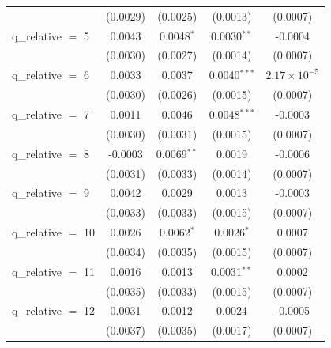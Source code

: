 \begin{tabular}{lcccc}
                        & (0.0029)             & (0.0025)            & (0.0013)                  & (0.0007)\\   
   q\_relative $=$ 5    & 0.0043               & 0.0048$^{*}$        & 0.0030$^{**}$             & -0.0004\\   
                        & (0.0030)             & (0.0027)            & (0.0014)                  & (0.0007)\\   
   q\_relative $=$ 6    & 0.0033               & 0.0037              & 0.0040$^{***}$            & $2.17\times 10^{-5}$\\    
                        & (0.0030)             & (0.0026)            & (0.0015)                  & (0.0007)\\   
   q\_relative $=$ 7    & 0.0011               & 0.0046              & 0.0048$^{***}$            & -0.0003\\   
                        & (0.0030)             & (0.0031)            & (0.0015)                  & (0.0007)\\   
   q\_relative $=$ 8    & -0.0003              & 0.0069$^{**}$       & 0.0019                    & -0.0006\\   
                        & (0.0031)             & (0.0033)            & (0.0014)                  & (0.0007)\\   
   q\_relative $=$ 9    & 0.0042               & 0.0029              & 0.0013                    & -0.0003\\   
                        & (0.0033)             & (0.0033)            & (0.0015)                  & (0.0007)\\   
   q\_relative $=$ 10   & 0.0026               & 0.0062$^{*}$        & 0.0026$^{*}$              & 0.0007\\   
                        & (0.0034)             & (0.0035)            & (0.0015)                  & (0.0007)\\   
   q\_relative $=$ 11   & 0.0016               & 0.0013              & 0.0031$^{**}$             & 0.0002\\   
                        & (0.0035)             & (0.0033)            & (0.0015)                  & (0.0007)\\   
   q\_relative $=$ 12   & 0.0031               & 0.0012              & 0.0024                    & -0.0005\\   
                        & (0.0037)             & (0.0035)            & (0.0017)                  & (0.0007)\\   

\end{tabular}
